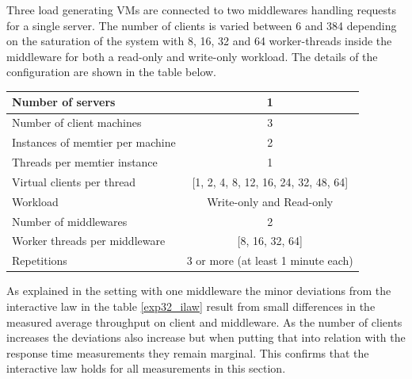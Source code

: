 \documentclass[11pt,a4paper]{article}
\begin{document}



Three load generating VMs are connected to two middlewares handling requests for a single server. 
The number of clients is varied between 6 and 384 depending on the saturation of the system with 8, 16, 32 and 64 worker-threads inside the middleware for both a read-only and write-only workload. The details of the configuration are shown in the table below.


\begin{center}
	\scriptsize{
		\begin{tabular}{|l|c|}
			\hline Number of servers                & 1                        \\ 
			\hline Number of client machines        & 3                        \\ 
			\hline Instances of memtier per machine & 2                        \\ 
			\hline Threads per memtier instance     & 1                        \\
			\hline Virtual clients per thread       & [1, 2, 4, 8, 12, 16, 24, 32, 48, 64] \\ 
			\hline Workload                         & Write-only and Read-only \\
			\hline Number of middlewares            & 2                        \\
			\hline Worker threads per middleware    & [8, 16, 32, 64]                  \\
			\hline Repetitions                      & 3 or more (at least 1 minute each)                \\ 
			\hline 
		\end{tabular}
	} 
\end{center}

As explained in the setting with one middleware the minor deviations from the interactive law in the table \ref{exp32_ilaw} result from small differences in the measured average throughput on client and middleware.
As the number of clients increases the deviations also increase but when putting that into relation with the response time measurements they remain marginal. This confirms that the interactive law holds for all measurements in this section.
\end{document}
